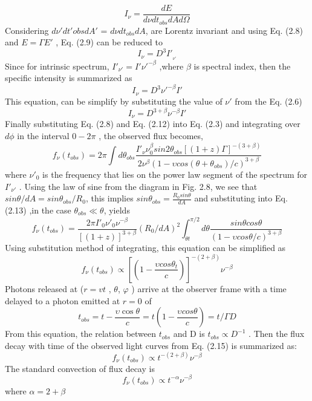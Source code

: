 \begin{equation}
I_{\nu} =\frac{dE}{d\nu dt_{obs}dAd\Omega}
\end{equation}
Considering $ d\nu'dt'{obs}dA' $ = $ d\nu dt_{obs} dA $, are Lorentz invariant and using Eq. (2.8) and $ E=\Gamma E' $ , Eq. (2.9) can be reduced to
\begin{equation}
I_{\nu} =D^{3}I'_{_{\nu'}}
\end{equation}
Since for intrinsic spectrum, $ I'_{\nu'}= I'\nu'^{-\beta} $ ,where $\beta $ is spectral index, then the specific intensity is summarized as
\begin{equation}
I_{\nu}= D^{3}\nu'^{-\beta}I'
\end{equation}
This equation, can be simplify by substituting the value of $\nu'$ from the Eq. (2.6)
\begin{equation}
I_{\nu} = D^{3+\beta}\nu^{-\beta}I'
\end{equation}
Finally substituting Eq. (2.8) and Eq. (2.12) into Eq. (2.3) and integrating
over  $ d\phi $ in the interval   $ 0  -  2 \pi $  , the observed flux becomes,
\begin{equation}
f_{\nu}(t_{obs}) = 2\pi \int d\theta_{obs}\frac{I'_{ \nu } \nu_{0}^{\beta}sin2\theta_{obs}[(1+z)\Gamma]^{-(3+\beta)}}{2\nu^{\beta}(1-\upsilon cos(\theta+\theta_{obs})/c)^{3+\beta}}
\end{equation}
where $ \nu'_{0} $ is the  frequency that lies on the power law segment of the spectrum for $ I'_{\nu'} $ . Using the law of sine from the diagram in Fig. 2.8, we see that $sin\theta/dA =sin\theta_{obs}/R_{0} $, this implies $ sin\theta_{obs}= \frac{R_{0}sin\theta}{dA}$ and substituting into Eq. (2.13) ,in the case $ \theta _{obs} \ll  \theta $, yields
\begin{equation}
f_{\nu}(t_{obs})=\frac{2 \pi I'_{0}\nu'_{0}\nu^{-\beta}}{[(1+z)]^{3+\beta}}(R_{0}/dA)^{2}\int_{\theta t}^{\pi/2} d \theta\frac{sin\theta cos\theta}{(1-\upsilon cos\theta/c)^{3+\beta}}
\end{equation}
Using substitution method of integrating, this equation can be simplified as
\begin{equation}
f_{\nu}(t_{obs})\propto [(1 -\frac{\upsilon cos\theta_{t}}{c} )]^{-(2+\beta)}\nu^{-\beta}
\end{equation}
Photons released at ($ r= vt $ , $ \theta $, $ \varphi $ ) arrive at the observer frame with a time delayed to  a photon emitted at $ r = 0 $ of
\begin{equation}
t_{obs}= t-\frac{\upsilon\cos\theta}{c}= t(1-\frac{\upsilon cos\theta}{c})=t/\Gamma D
\end{equation}
From this equation, the relation between $ t_{obs} $ and D is $t_{obs}  \propto D^{-1} $ . Then the flux decay with time of the observed light curves from Eq. (2.15) is summarized as:
\begin{equation}
f_{\nu}(t_{obs})\propto t^{-(2+\beta)}\nu^{-\beta}
\end{equation}
The standard convection of flux decay is
\begin{equation}
f_{\nu}(t_{obs}) \propto t^{-\alpha}\nu^{-\beta}
\end{equation}
where $ \alpha = 2 + \beta $
